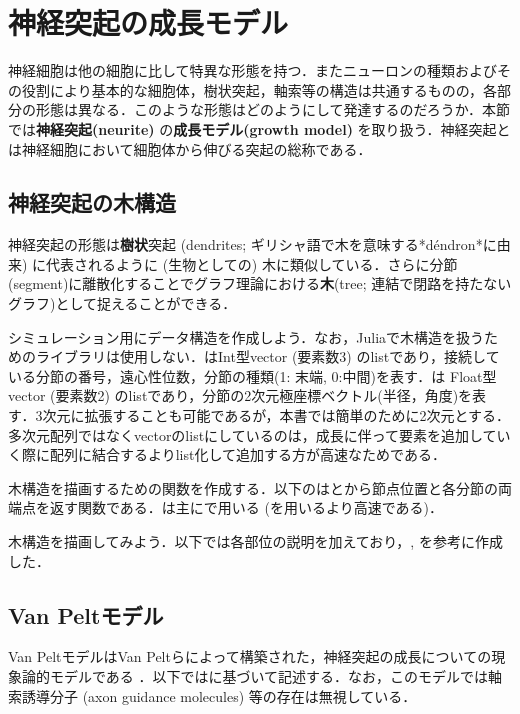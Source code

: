 \section{神経突起の成長モデル}
神経細胞は他の細胞に比して特異な形態を持つ．またニューロンの種類およびその役割により基本的な細胞体，樹状突起，軸索等の構造は共通するものの，各部分の形態は異なる．このような形態はどのようにして発達するのだろうか．本節では\textbf{神経突起(neurite)} の\textbf{成長モデル(growth model)} を取り扱う．神経突起とは神経細胞において細胞体から伸びる突起の総称である．
\subsection{神経突起の木構造}
神経突起の形態は\textbf{樹状}突起 (dendrites; ギリシャ語で木を意味する*déndron*に由来) に代表されるように (生物としての) 木に類似している．さらに分節(segment)に離散化することでグラフ理論における\textbf{木}(tree; 連結で閉路を持たないグラフ)として捉えることができる．

シミュレーション用にデータ構造を作成しよう．なお，Juliaで木構造を扱うためのライブラリは使用しない．はInt型vector (要素数3) のlistであり，接続している分節の番号，遠心性位数，分節の種類(1: 末端, 0:中間)を表す．は Float型vector (要素数2) のlistであり，分節の2次元極座標ベクトル(半径，角度)を表す．3次元に拡張することも可能であるが，本書では簡単のために2次元とする．多次元配列ではなくvectorのlistにしているのは，成長に伴って要素を追加していく際に配列に結合するよりlist化して追加する方が高速なためである．


木構造を描画するための関数を作成する．以下のはとから節点位置と各分節の両端点を返す関数である．は主にで用いる (を用いるより高速である)．


木構造を描画してみよう．以下では各部位の説明を加えており，\cite{Koene2009-hv}, \cite{Cuntz2010-in}を参考に作成した．



\subsection{Van Peltモデル}
Van PeltモデルはVan Peltらによって構築された，神経突起の成長についての現象論的モデルである \cite{Van_Pelt2002-vm}．以下では\cite{Koene2009-hv}に基づいて記述する．なお，このモデルでは軸索誘導分子 (axon guidance molecules) 等の存在は無視している．


